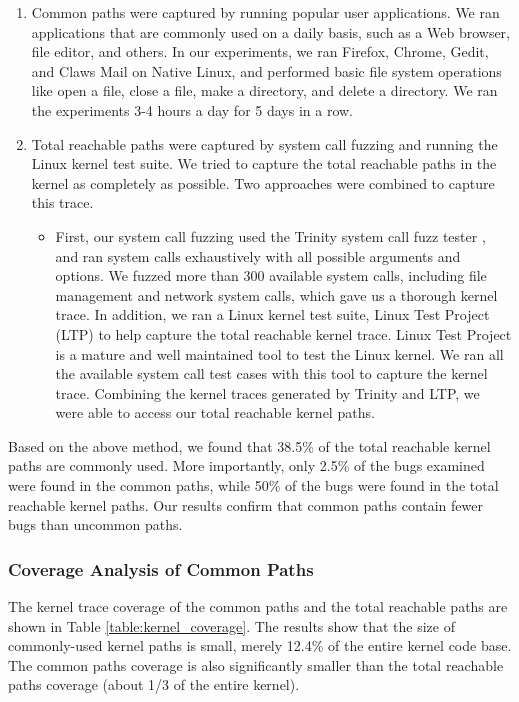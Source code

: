 \begin{enumerate}
\item Common paths were captured by running popular user applications. 
We ran applications that are commonly used on a daily basis, such as a Web browser, file editor, and others. 
In our experiments, we ran Firefox, Chrome, Gedit, and Claws Mail on Native Linux, 
and performed basic file system operations like open a file, close a file, make a directory, 
and delete a directory. We ran the experiments 3-4 hours a day for  5 days in a row.

\item Total reachable paths were captured by system call fuzzing and running the Linux kernel test suite. 
We tried to capture the total reachable paths in the kernel as completely as possible. 
Two approaches were combined to capture this trace.

\begin{itemize}
\item First, our system call fuzzing used the Trinity system call fuzz tester \cite{Trinity}, 
and ran system calls exhaustively with all possible arguments and options. 
We fuzzed more than 300 available system calls, including file management and network system calls, 
which gave us a thorough kernel trace. In addition, we ran a Linux kernel test suite, 
Linux Test Project (LTP) \cite{LTP} to help capture the total reachable kernel trace. 
Linux Test Project is a mature and well maintained tool to test the Linux kernel. 
We ran all the available system call test cases with this tool to capture the kernel trace. 
Combining the kernel traces generated by Trinity and LTP, we were able to access our total reachable kernel paths.
\end{itemize}
\end{enumerate}

Based on the above method, we found that 38.5\% of the total reachable kernel paths are commonly used. 
More importantly, only 2.5\% of the bugs examined were found in the common paths, 
while 50\% of the bugs were found in the total reachable kernel paths. 
Our results confirm that common paths contain fewer bugs than uncommon paths. 

\subsubsection{Coverage Analysis of Common Paths}

The kernel trace coverage of the common paths and the total reachable paths are shown in Table \ref{table:kernel_coverage}. 
The results show that the size of commonly-used kernel paths is small, merely 12.4\% of the entire kernel code base. 
The common paths coverage is also significantly smaller than the total reachable paths coverage 
(about 1/3 of the entire kernel).

